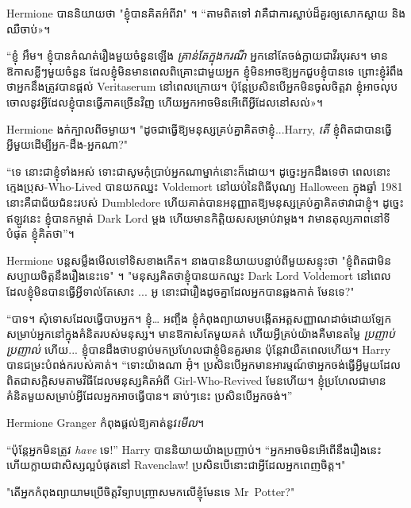 Hermione បាននិយាយថា "ខ្ញុំបានគិតអំពីវា" ។ “តាម​ពិត​ទៅ វា​គឺ​ជា​ការ​ស្លាប់​ដ៏​គួរ​ឲ្យ​សោកស្ដាយ និង​ឈឺ​ចាប់»។

“ខ្ញុំ អឹម។ ខ្ញុំបានកំណត់រឿងមួយចំនួនឡើង \emph{គ្រាន់តែក្នុងករណី} អ្នកនៅតែចង់ក្លាយជាវីរបុរស។ មាន​ឱកាស​ខ្លីៗ​មួយ​ចំនួន ដែល​ខ្ញុំ​មិន​មាន​ពេល​ពិគ្រោះ​ជាមួយ​អ្នក ខ្ញុំ​មិន​អាច​ឱ្យ​អ្នក​ជួប​ខ្ញុំ​បាន​ទេ ព្រោះ​ខ្ញុំ​រំពឹង​ថា​អ្នក​នឹង​ត្រូវ​បាន​ផ្តល់ Veritaserum នៅ​ពេល​ក្រោយ។ ប៉ុន្តែ​ប្រសិន​បើ​អ្នក​មិន​ចូល​ចិត្ត​វា ខ្ញុំ​អាច​លុប​ចោល​នូវ​អ្វី​ដែល​ខ្ញុំ​បាន​ធ្វើ​ភាគ​ច្រើន​វិញ ហើយ​អ្នក​អាច​មិន​អើពើ​អ្វី​ដែល​នៅ​សល់»។

Hermione ងក់ក្បាលពីចម្ងាយ។ "ដូចជាធ្វើឱ្យមនុស្សគ្រប់គ្នាគិតថាខ្ញុំ...Harry, \emph{តើ} ខ្ញុំពិតជាបានធ្វើអ្វីមួយដើម្បីអ្នក-ដឹង-អ្នកណា?"

“ទេ នោះជាខ្ញុំទាំងអស់ ទោះជាសូមកុំប្រាប់អ្នកណាម្នាក់នោះក៏ដោយ។ ដូច្នេះអ្នកដឹងទេថា ពេលនោះក្មេងប្រុស-Who-Lived បានយកឈ្នះ Voldemort នៅយប់នៃពិធីបុណ្យ Halloween ក្នុងឆ្នាំ 1981 នោះគឺជាជ័យជំនះរបស់ Dumbledore ហើយគាត់បានអនុញ្ញាតឱ្យមនុស្សគ្រប់គ្នាគិតថាវាជាខ្ញុំ។ ដូច្នេះ​ឥឡូវ​នេះ ខ្ញុំ​បាន​កម្ចាត់ Dark Lord ម្តង ហើយ​មាន​កិត្តិយស​សម្រាប់​វា​ម្តង។ វា​មាន​តុល្យភាព​នៅ​ទី​បំផុត ខ្ញុំ​គិត​ថា​”។

Hermione បន្តសម្លឹងមើលទៅទិសខាងកើត។ នាងបាននិយាយបន្ទាប់ពីមួយសន្ទុះថា "ខ្ញុំពិតជាមិនសប្បាយចិត្តនឹងរឿងនេះទេ" ។ "មនុស្សគិតថាខ្ញុំបានយកឈ្នះ Dark Lord Voldemort នៅពេលដែលខ្ញុំមិនបានធ្វើអ្វីទាល់តែសោះ ... អូ នោះជារឿងដូចគ្នាដែលអ្នកបានឆ្លងកាត់ មែនទេ?"

“បាទ។ សុំទោសដែលធ្វើបាបអ្នក។ ខ្ញុំ… អញ្ចឹង ខ្ញុំកំពុងព្យាយាមបង្កើតអត្តសញ្ញាណដាច់ដោយឡែកសម្រាប់អ្នកនៅក្នុងគំនិតរបស់មនុស្ស។ មាន​ឱកាស​តែ​មួយ​គត់ ហើយ​អ្វី​គ្រប់​យ៉ាង​គឺ​មាន​តម្លៃ \emph{ប្រញាប់​ប្រញាល់​} ហើយ... ខ្ញុំ​បាន​ដឹង​ថា​បន្ទាប់​មក​ប្រហែល​ជា​ខ្ញុំ​មិន​គួរ​មាន ប៉ុន្តែ​វា​យឺត​ពេល​ហើយ។ Harry បានជម្រះបំពង់ករបស់គាត់។ “ទោះយ៉ាងណា អ៊ុំ។ ប្រសិនបើអ្នកមានអារម្មណ៍ថាអ្នកចង់ធ្វើអ្វីមួយដែលពិតជាសក្ដិសមតាមវិធីដែលមនុស្សគិតអំពី Girl-Who-Revived មែនហើយ។ ខ្ញុំប្រហែលជាមានគំនិតមួយសម្រាប់អ្វីដែលអ្នកអាចធ្វើបាន។ ឆាប់ៗនេះ ប្រសិនបើអ្នកចង់។”

Hermione Granger កំពុងផ្តល់ឱ្យគាត់នូវ\emph{មើល}។

“ប៉ុន្តែអ្នកមិនត្រូវ \emph{ have} ទេ!” Harry បាននិយាយយ៉ាងប្រញាប់។ “អ្នកអាចមិនអើពើនឹងរឿងនេះ ហើយក្លាយជាសិស្សល្អបំផុតនៅ Ravenclaw! ប្រសិនបើនោះជាអ្វីដែលអ្នកពេញចិត្ត។"

"តើអ្នកកំពុងព្យាយាមប្រើចិត្តវិទ្យាបញ្ច្រាសមកលើខ្ញុំមែនទេ Mr~Potter?"

